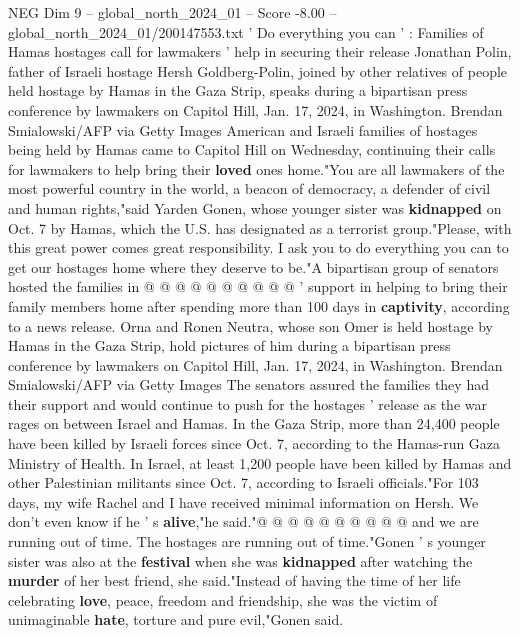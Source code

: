 \begin{textsample}{NEG Dim 9 – global\_north\_2024\_01 – Score -8.00 – global\_north\_2024\_01/200147553.txt}  \label{ex:f9_neg_192}
' Do everything you can ' : Families of Hamas hostages call for lawmakers ' help in securing their release Jonathan Polin, father of Israeli hostage Hersh Goldberg-Polin, joined by other relatives of people held hostage by Hamas in the Gaza Strip, speaks during a bipartisan press conference by lawmakers on Capitol Hill, Jan. 17, 2024, in Washington.
Brendan Smialowski/AFP via Getty Images American and Israeli families of hostages being held by Hamas came to Capitol Hill on Wednesday, continuing their calls for lawmakers to help bring their \textbf{loved} ones home."You are all lawmakers of the most powerful country in the world, a beacon of democracy, a defender of civil and human rights,"said Yarden Gonen, whose younger sister was \textbf{kidnapped} on Oct. 7 by Hamas, which the U.S. has designated as a terrorist group."Please, with this great power comes great responsibility.
I ask you to do everything you can to get our hostages home where they deserve to be."A bipartisan group of senators hosted the families in @ @ @ @ @ @ @ @ @ @ ' support in helping to bring their family members home after spending more than 100 days in \textbf{captivity}, according to a news release.
Orna and Ronen Neutra, whose son Omer is held hostage by Hamas in the Gaza Strip, hold pictures of him during a bipartisan press conference by lawmakers on Capitol Hill, Jan. 17, 2024, in Washington.
Brendan Smialowski/AFP via Getty Images The senators assured the families they had their support and would continue to push for the hostages ' release as the war rages on between Israel and Hamas.
In the Gaza Strip, more than 24,400 people have been killed by Israeli forces since Oct. 7, according to the Hamas-run Gaza Ministry of Health.
In Israel, at least 1,200 people have been killed by Hamas and other Palestinian militants since Oct. 7, according to Israeli officials."For 103 days, my wife Rachel and I have received minimal information on Hersh.
We don't even know if he ' s \textbf{alive},"he said."@ @ @ @ @ @ @ @ @ @ and we are running out of time.
The hostages are running out of time."Gonen ' s younger sister was also at the \textbf{festival} when she was \textbf{kidnapped} after watching the \textbf{murder} of her best friend, she said."Instead of having the time of her life celebrating \textbf{love}, peace, freedom and friendship, she was the victim of unimaginable \textbf{hate}, torture and pure evil,"Gonen said.

\end{textsample}
